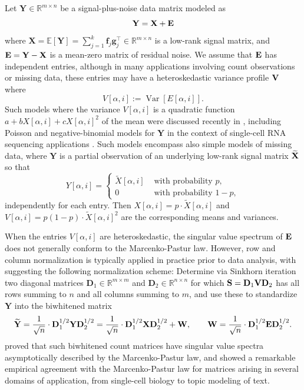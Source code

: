 \documentclass[10pt,reqno]{amsart}
\def\a{\alpha}
\def\f{\mathbf{f}}
\def\g{\mathbf{g}}
\def\W{\mathbf{W}}
\def\S{\mathbf{S}}
\def\D{\mathbf{D}}
\def\X{\mathbf{X}}
\def\Y{\mathbf{Y}}
\def\E{\mathbb{E}}
\def\R{\mathbb{R}}
\def\Var{\operatorname{Var}}
\begin{document}
\begin{example}\label{ex:biwhitenedcount}
Let $\Y \in \R^{m \times n}$ be a signal-plus-noise data matrix modeled as
\[\Y=\X+\Eb\]
where $\X=\E[\Y]=\sum_{j=1}^k \f_j\g_j^\top \in \R^{m \times n}$ is a low-rank
signal matrix, and $\Eb=\Y-\X$ is a mean-zero matrix of residual noise. We
assume that $\mathbf{E}$ has independent entries, although
in many applications involving count observations or missing data, these
entries may have a heteroskedastic variance profile $\mathbf{V}$ where
\[V[\a,i]:=\Var[E[\a,i]].\]
Such models where the variance $V[\a,i]$ is a quadratic
function $a+bX[\a,i]+cX[\a,i]^2$ of the mean were discussed recently
in \cite{landa2021biwhitening}, including Poisson and
negative-binomial models for $\Y$ in the context of
single-cell RNA sequencing applications
\cite{townes2019feature,hafemeister2019normalization,sarkar2021separating}.
Such models encompass also simple models of missing data, where $\Y$ is a partial
observation of an underlying low-rank signal matrix $\widetilde{\mathbf{X}}$ so that
\[Y[\a,i]=\begin{cases} \widetilde{X}[\a,i] & \text{ with probability } p,\\
0 & \text{ with probability } 1-p,
\end{cases}\]
independently for each entry. 
Then $X[\a,i]=p \cdot \widetilde{X}[\a,i]$
and $V[\a,i]=p(1-p) \cdot \widetilde{X}[\a,i]^2$ are the corresponding means and
variances.

When the entries $V[\a,i]$ are heteroskedastic, the singular
value spectrum of $\mathbf{E}$ does not generally conform to the Marcenko-Pastur law.
However, row and column normalization is typically applied in
practice prior to data analysis,
with \cite{landa2021biwhitening} suggesting the following normalization
scheme: Determine via Sinkhorn iteration two
diagonal matrices $\D_1 \in \R^{m \times m}$ and $\D_2 \in \R^{n \times n}$
for which $\S=\D_1 \Vb \D_2$
has all rows summing to $n$ and all columns summing to $m$, and use these
to standardize $\Y$ into the biwhitened matrix
\[\widetilde{\Y}=\frac{1}{\sqrt{n}} \cdot \D_1^{1/2} \Y \D_2^{1/2}
=\frac{1}{\sqrt{n}} \cdot \D_1^{1/2} \X \D_2^{1/2}+\W,
\qquad \W=\frac{1}{\sqrt{n}} \cdot \D_1^{1/2}\Eb\D_2^{1/2}.\]
\cite{landa2021biwhitening} proved that such biwhitened count matrices 
have singular value spectra asymptotically described by the Marcenko-Pastur law,
and showed a remarkable empirical agreement with the Marcenko-Pastur law
for matrices arising in several domains of application,
from single-cell biology to topic modeling of text.


\end{example}
\end{document}
